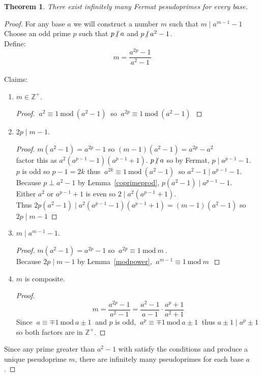 \documentclass[12pt]{extarticle}
\renewcommand\qedsymbol{$\square$}
\newcommand{\divides}{\mid}
\newcommand{\ndivides}{\centernot \mid}
\newcommand{\Zplus}{\mathbb{Z}^{+}}
\newtheorem{theorem}{Theorem}[section]
\newenvironment{lproof}{\begin{proof} \renewcommand{\qedsymbol}{}}{\end{proof}}
\renewcommand{\mod}[3]{\: #1 \equiv #2 \: \mathrm{mod} \: #3 \:}
\begin{document}
\begin{theorem}
There exist infinitely many Fermat pesudoprimes for every base. 
\end{theorem}

\begin{proof}
For any base $a$ we will construct a number $m$ such that $m \divides a^{m-1} - 1$
Choose an odd prime $p$ such that $p \ndivides a$ and $p \ndivides a^2 - 1$.\\ Define: \[m = \frac{a^{2p} - 1}{a^2 - 1} \]\\
Claims:
\begin{enumerate}
\item $m \in \Zplus$. 
\begin{lproof}
$\mod{a^2}{1}{(a^2-1)}$ so $\mod{a^{2p}}{1}{(a^2-1)}$
\end{lproof}

\item $2p \divides m-1$. 
\begin{lproof}
$m(a^2 - 1) = a^{2p} - 1$ so $(m-1)(a^2-1) = a^{2p} - a^2$ \\
factor this as $a^2(a^{p-1}-1)(a^{p-1}+1)$. $p \ndivides a$ so by Fermat, $p \divides a^{p-1} - 1$. \\
$p$ is odd so $p-1 = 2k$ thus $ \mod{a^{2k}}{1}{(a^2-1)}$ so $a^2-1 \divides a^{p-1}-1$. \\
Because $p \perp a^2-1$ by Lemma~\ref{coprimeprod}, $p(a^2-1) \divides a^{p-1} - 1$. \\
Either $a^2$ or $a^{p-1} + 1$ is even so $2 \divides a^2(a^{p-1} + 1)$.\\ Thus $2p(a^2-1) \divides a^2(a^{p-1}-1)(a^{p-1}+1) = (m-1)(a^2-1)$ so $2p \divides m-1$
\end{lproof}


\item $m \divides a^{m-1} - 1$.

\begin{lproof}
$m(a^2-1) = a^{2p} - 1$ so $\mod{a^{2p}}{1}{m}$. \\ Because $2p \divides m-1$ by Lemma~\ref{modpower}, $\mod{a^{m-1}}{1}{m}$
\end{lproof}

\item $m$ is composite.

\begin{lproof}
\[m = \frac{a^{2p} - 1}{a^2 - 1} = \frac{a^{2} - 1}{a - 1}  \cdot \frac{a^{p} + 1}{a^2 + 1}\]
Since $\mod{a}{\mp 1}{a \pm 1}$ and $p$ is odd, $\mod{a^p}{\mp 1}{a \pm 1}$ thus $a \pm 1 \divides a^p \pm 1$ so both factors are in $\Zplus$.
\end{lproof}
\end{enumerate}
Since any prime greater than $a^2 - 1$ with satisfy the conditions and produce a unique pseudoprime $m$, there are infinitely many pseudoprimes for each base $a$.
\end{proof}
\end{document}
